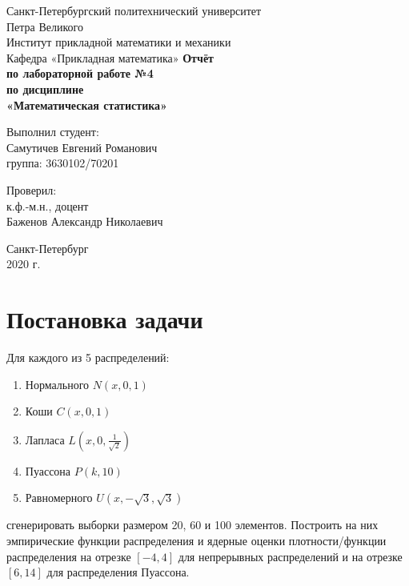 \documentclass[12pt,a4paper]{article}
\begin{document}
	
\begin{titlepage}
	\begin{center}		
		\vfill	
		Санкт-Петербургский политехнический университет \\
		Петра Великого\\
		\vskip 1cm
		Институт прикладной математики и механики \\
		Кафедра «Прикладная математика»
		\vfill
		\textbf{Отчёт\\
			по лабораторной работе №4\\
			по дисциплине\\
			«Математическая статистика»\\}
		\vfill
	\end{center}
	\vfill
	\hfill
	\begin{minipage}{0.4\textwidth}
		Выполнил студент:\\
		Самутичев Евгений Романович\\
		группа: 3630102/70201\\
	\end{minipage}
	\vfill
	\hfill 
	\begin{minipage}{0.4\textwidth}
		Проверил:\\
		к.ф.-м.н., доцент\\
		Баженов Александр Николаевич\
	\end{minipage}
	\vfill
	\begin{center}
		Санкт-Петербург\\2020 г.
	\end{center}
\end{titlepage}

\tableofcontents
\listoffigures
\pagebreak

\section{Постановка задачи}
Для каждого из 5 распределений:

\begin{enumerate}
	\item Нормального $N(x, 0, 1)$
	\item Коши $C(x, 0, 1)$
	\item Лапласа $L(x, 0, \frac{1}{\sqrt{2}})$
	\item Пуассона $P(k, 10)$
	\item Равномерного $U(x, -\sqrt{3}, \sqrt{3})$	
\end{enumerate}

сгенерировать выборки размером 20, 60 и 100 элементов. Построить на них эмпирические функции распределения и ядерные оценки плотности/функции распределения на отрезке $[-4, 4]$ для непрерывных распределений и на отрезке $[6,14]$ для распределения Пуассона.
\pagebreak
\end{document}
